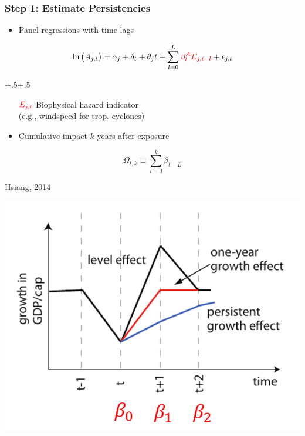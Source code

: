 \documentclass[
c,
11pt,
aspectratio=169, %
final,
]{beamer}
\begin{document}
\begin{frame}
  \frametitle{Step 1: Estimate Persistencies}
  \begin{minipage}[r]{.6\linewidth}
    \vspace{0pt}
  \begin{itemize}
  \item Panel regressions with time lags
  \end{itemize}
  \begin{equation*}
    \ln\big(A_{j,t} \big) = \gamma_j + \delta_{t} + \theta_j t + \sum_{l=0}^{L}\tc{red}{\bA_{l}E_{j,t-l}}+\epsilon_{j,t}
  \end{equation*}
  \begin{adjustwidth}{+.5\leftframemargin}{+.5\rightframemargin}
    \begin{itemize}
  \item[$\tc{red}{E_{j,t}}$] Biophysical hazard indicator\\ (e.g., windspeed for trop. cyclones)
  \end{itemize}
\end{adjustwidth}
\begin{itemize}
  \item Cumulative impact $k$ years after exposure
  \end{itemize}
  \begin{equation*}
    \Omega_{t,k}\equiv\sum_{l=0}^{k}\beta_{t-L}
  \end{equation*}
  \begin{sources}
    \item Hsiang, 2014
  \end{sources}
\end{minipage}\hfill
\begin{minipage}[r]{.39\linewidth}
    \vspace{-30pt}
  \centering
  \includegraphics[width=.75\textwidth]{figures/sketch_let_effect}

\end{minipage}
\end{frame}
\end{document}
